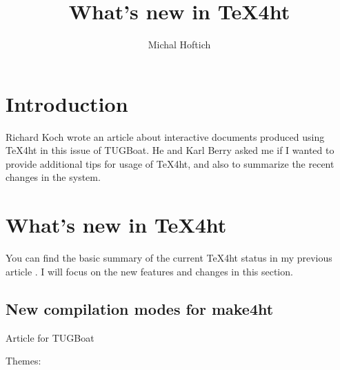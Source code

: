 \documentclass{ltugboat}
\title{What's new in \TeX4ht}
\author{Michal Hoftich}
\begin{document}
\maketitle

\begin{abstract}
\end{abstract}

\section{Introduction}

Richard Koch wrote an article about interactive documents produced using
\TeX4ht in this issue of TUGBoat. He and Karl Berry asked me if I wanted 
to provide additional tips for usage of \TeX4ht, and also to summarize
the recent changes in the system.


\hypertarget{Whatux27sux20newux20inux20TeX4ht}{%
\section{What's new in TeX4ht}\label{Whatux27sux20newux20inux20TeX4ht}}

You can find the basic summary of the current \TeX4ht status in my previous article
\cite{hoftich19}. I will focus on the new features and changes in this section.

\subsection{New compilation modes for make4ht}

Article for TUGBoat

Themes:
\end{document}
